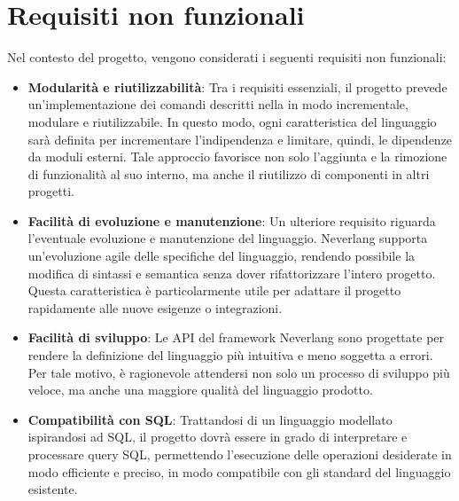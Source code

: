 \documentclass[12pt,a4paper,openright,twoside]{book}
\begin{document}
\section{Requisiti non funzionali}
Nel contesto del progetto, vengono considerati i seguenti requisiti non funzionali:
\begin{itemize}
    \item \textbf{Modularità e riutilizzabilità}: Tra i requisiti essenziali, il progetto prevede un’implementazione dei comandi descritti 
    nella  in modo incrementale, modulare e riutilizzabile. In questo modo, ogni caratteristica del 
    linguaggio sarà definita per incrementare l’indipendenza e limitare, quindi, le dipendenze da moduli esterni. Tale approccio favorisce 
    non solo l’aggiunta e la rimozione di funzionalità al suo interno, ma anche il riutilizzo di componenti in altri progetti.
    \item \textbf{Facilità di evoluzione e manutenzione}: Un ulteriore requisito riguarda l’eventuale evoluzione e manutenzione del 
    linguaggio. Neverlang supporta un’evoluzione agile delle specifiche del linguaggio, rendendo possibile la modifica di sintassi e 
    semantica senza dover rifattorizzare l’intero progetto. Questa caratteristica è particolarmente utile per adattare il progetto 
    rapidamente alle nuove esigenze o integrazioni.
    \item \textbf{Facilità di sviluppo}: Le API del framework Neverlang sono progettate per rendere la definizione del linguaggio più 
    intuitiva e meno soggetta a errori. Per tale motivo, è ragionevole attendersi non solo un processo di sviluppo più veloce, ma anche una 
    maggiore qualità del linguaggio prodotto.
    \item \textbf{Compatibilità con SQL}: Trattandosi di un linguaggio modellato ispirandosi ad SQL, il progetto dovrà essere in grado di 
    interpretare e processare query SQL, permettendo l’esecuzione delle operazioni desiderate in modo efficiente e preciso, in modo 
    compatibile con gli standard del linguaggio esistente.
\end{itemize}
\end{document}
